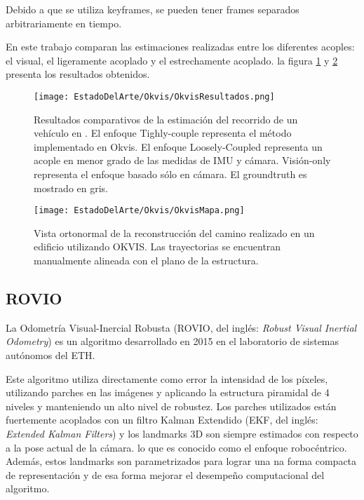 Debido a que se utiliza keyframes, se pueden tener frames separados arbitrariamente en tiempo. 

En este trabajo comparan las estimaciones realizadas entre los diferentes acoples: el visual, el ligeramente acoplado y el estrechamente acoplado. la figura \ref{fig:RovioEstimacion} y \ref{fig:RovioEstimacionMapa} presenta los resultados obtenidos.

\begin{figure}[H]
	\centering
	\texttt{[image: EstadoDelArte/Okvis/OkvisResultados.png]}
	\caption[Resultados comparativos de la estimación del recorrido de un vehículo  en \cite{okvis}]{Resultados comparativos de la estimación del recorrido de un vehículo  en \cite{okvis} . El enfoque Tighly-couple representa el método implementado en Okvis. El enfoque Loosely-Coupled representa un acople en menor grado de las medidas de IMU y cámara. Visión-only representa el enfoque basado sólo en cámara. El groundtruth es mostrado en gris.}
	\label{fig:RovioEstimacion}
\end{figure}


\begin{figure}[H]
	\centering
	\texttt{[image: EstadoDelArte/Okvis/OkvisMapa.png]}
	\caption[Vista ortonormal de la reconstrucción del camino realizado en un edificio utilizando OKVIS]{Vista ortonormal de la reconstrucción del camino realizado en un edificio utilizando OKVIS. Las trayectorias se encuentran manualmente alineada con el plano de la estructura.}
	\label{fig:RovioEstimacionMapa}
\end{figure}


\subsection{ROVIO}

La Odometría Visual-Inercial Robusta (ROVIO, del inglés: \textit{Robust Visual Inertial Odometry}) es un algoritmo desarrollado en 2015 en el laboratorio de sistemas autónomos del ETH.

Este algoritmo utiliza directamente como error la intensidad de los píxeles, utilizando parches en las  imágenes y aplicando la estructura piramidal de 4 niveles y manteniendo un alto nivel de robustez. Los parches utilizados están fuertemente acoplados con un filtro Kalman Extendido (EKF, del inglés: \textit{Extended Kalman Filters}) y los landmarks 3D son siempre estimados con respecto a la pose actual de la cámara. lo que es conocido como el enfoque robocéntrico. Además, estos landmarks son parametrizados para lograr una na forma compacta de representación y de esa forma mejorar el desempeño computacional del algoritmo. 

